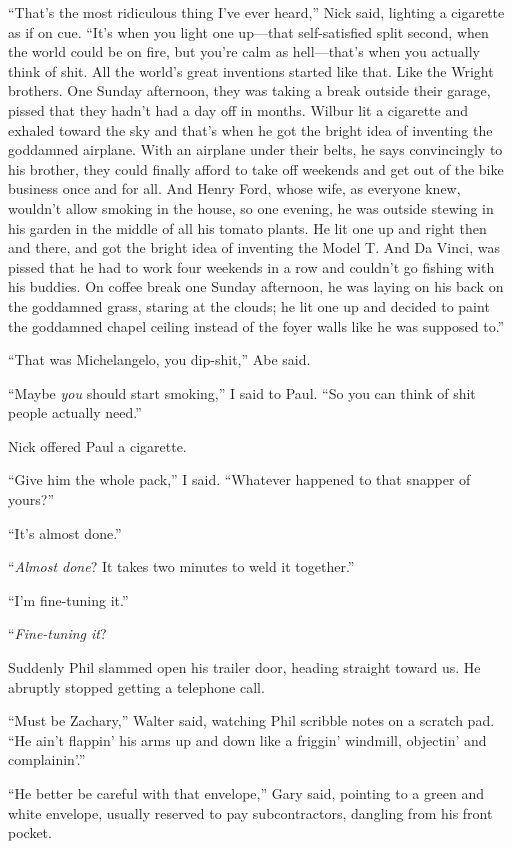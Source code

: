 ``That's the most ridiculous thing I've ever heard,'' Nick said,
lighting a cigarette as if on cue. ``It's when you light one up---that
self-satisfied split second, when the world could be on fire, but you're
calm as hell---that's when you actually think of shit. All the world's
great inventions started like that. Like the Wright brothers. One Sunday
afternoon, they was taking a break outside their garage, pissed that
they hadn't had a day off in months. Wilbur lit a cigarette and exhaled
toward the sky and that's when he got the bright idea of inventing the
goddamned airplane. With an airplane under their belts, he says
convincingly to his brother, they could finally afford to take off
weekends and get out of the bike business once and for all. And Henry
Ford, whose wife, as everyone knew, wouldn't allow smoking in the house,
so one evening, he was outside stewing in his garden in the middle of
all his tomato plants. He lit one up and right then and there, and got
the bright idea of inventing the Model T. And Da Vinci, was pissed that
he had to work four weekends in a row and couldn't go fishing with his
buddies. On coffee break one Sunday afternoon, he was laying on his back
on the goddamned grass, staring at the clouds; he lit one up and decided
to paint the goddamned chapel ceiling instead of the foyer walls like he
was supposed to.''

``That was Michelangelo, you dip-shit,'' Abe said.

``Maybe \emph{you} should start smoking,'' I said to Paul. ``So you can
think of shit people actually need.''

Nick offered Paul a cigarette.

``Give him the whole pack,'' I said. ``Whatever happened to that snapper
of yours?''

``It's almost done.''

``\emph{Almost done}? It takes two minutes to weld it together.''

``I'm fine-tuning it.''

``\emph{Fine-tuning it}?

Suddenly Phil slammed open his trailer door, heading straight toward us.
He abruptly stopped getting a telephone call.

``Must be Zachary,'' Walter said, watching Phil scribble notes on a
scratch pad. ``He ain't flappin' his arms up and down like a friggin'
windmill, objectin' and complainin'.''

``He better be careful with that envelope,'' Gary said, pointing to a
green and white envelope, usually reserved to pay subcontractors,
dangling from his front pocket.

